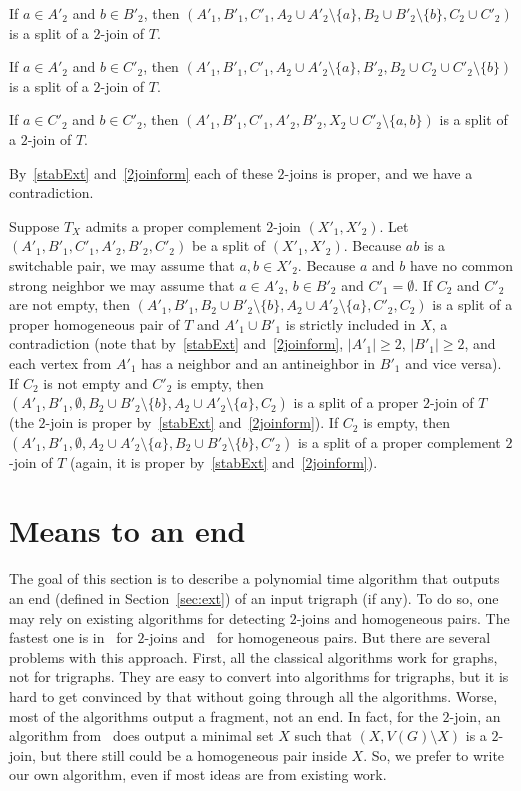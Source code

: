 \documentclass[11 pt] {article}
\newcommand\blackslug{\hbox{\hskip 1pt \vrule width 4pt height 8pt depth 1.5pt
        \hskip 1pt}}
\newcommand\bbox{\hfill \quad \blackslug \medbreak}
\begin{document}
If $a\in A'_2$ and $b\in B'_2$, then $(A'_1,B'_1,C'_1, A_2 \cup
A'_2\setminus \{a\}, B_2 \cup B'_2\setminus \{b\}, C_2 \cup C'_2)$ is
a split of a  $2$-join of $T$.

If $a\in A'_2$ and $b\in C'_2$, then $(A'_1,B'_1,C'_1, A_2 \cup
A'_2\setminus \{a\}, B'_2, B_2\cup C_2 \cup C'_2\setminus\{b\})$ is a
split of a  $2$-join of $T$.

If $a\in C'_2$ and $b\in C'_2$, then $(A'_1,B'_1,C'_1,A'_2, B'_2, X_2
\cup C'_2\setminus\{a,b\})$ is a split of a  $2$-join of $T$.

By~\ref{stabExt} and~\ref{2joinform} each of these $2$-joins is proper, and we have a
contradiction.


Suppose $T_X$ admits a proper complement $2$-join $(X'_1,X'_2)$. Let
$(A'_1,B'_1,C'_1,A'_2,B'_2,C'_2)$ be a split of $(X'_1,X'_2)$.
Because $ab$ is a switchable pair, we may assume that $a,b\in X'_2$.
Because $a$ and $b$ have no common strong neighbor we may assume that
$a\in A'_2$, $b\in B'_2$ and $C'_1=\emptyset$. If $C_2$ and $C'_2$ are
not empty, then $(A'_1,B'_1,B_2 \cup B'_2\setminus\{b\}, A_2 \cup
A'_2\setminus \{a\}, C'_2, C_2)$ is a split of a proper homogeneous
pair of $T$ and $A'_1\cup B'_1$ is strictly included in $X$, a
contradiction (note that by~\ref{stabExt} and~\ref{2joinform},
$|A'_1|\geq 2$, $|B'_1|\geq 2$, and each vertex from $A'_1$ has a
neighbor and an antineighbor in $B'_1$ and vice versa). If $C_2$ is
not empty and $C'_2$ is empty, then $(A'_1,B'_1,\emptyset, B_2 \cup
B'_2\setminus\{b\}, A_2 \cup A'_2\setminus\{a\}, C_2)$ is a split of a
proper $2$-join of $T$ (the $2$-join is proper by~\ref{stabExt}
and~\ref{2joinform}). If $C_2$ is empty, then $(A'_1,B'_1,\emptyset,
A_2 \cup A'_2\setminus\{a\}, B_2 \cup B'_2\setminus\{b\}, C'_2)$ is a
split of a proper complement $2$-join of $T$ (again, it is proper
by~\ref{stabExt} and~\ref{2joinform}).  \bbox

\section{Means to an end}
\label{sec:end}

The goal of this section is to describe a polynomial time algorithm
that outputs an end (defined in Section~\ref{sec:ext}) of an input
trigraph (if any).  To do so, one may rely on existing algorithms for
detecting $2$-joins and homogeneous pairs.  The fastest one is
in~\cite{ChHaTrVu:2-join} for $2$-joins and~\cite{HaMaMo:HP} for
homogeneous pairs.  But there are several problems with this approach.
First, all the classical algorithms work for graphs, not for
trigraphs.  They are easy to convert into algorithms for trigraphs,
but it is hard to get convinced by that without going through all the
algorithms.  Worse, most of the algorithms output a fragment, not an
end.  In fact, for the $2$-join, an algorithm
from~\cite{ChHaTrVu:2-join} does output a minimal set $X$ such that
$(X, V(G)\setminus X)$ is a $2$-join, but there still could be a
homogeneous pair inside $X$.  So, we prefer to write our own
algorithm, even if most ideas are from existing work.
\end{document}
